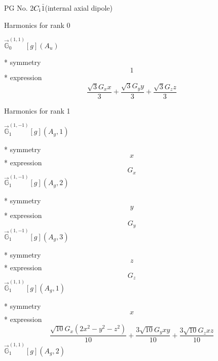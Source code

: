 \documentclass[fleqn,8pt]{jsarticle}
\begin{document}
\setcounter{MaxMatrixCols}{32}

\renewcommand{\tablename}{Table~}
\renewcommand{\figurename}{Figure~}
\begin{center}
\LARGE
PG No. 2\quad$C_{\rm i}$\quad$\bar{1}$\quad[ triclinic ] (internal axial dipole)
\end{center}

\noindent * Harmonics for rank 0

\noindent\quad $\vec{\mathbb{G}}_{0}^{(1,1)}[g](A_{u})$

\noindent\quad ** symmetry
\begin{dmath*}
1
\end{dmath*}
\noindent\quad ** expression
\begin{dmath*}
\frac{\sqrt{3} G_{x} x}{3} + \frac{\sqrt{3} G_{y} y}{3} + \frac{\sqrt{3} G_{z} z}{3}
\end{dmath*}

\noindent * Harmonics for rank 1

\noindent\quad $\vec{\mathbb{G}}_{1}^{(1,-1)}[g](A_{g},1)$

\noindent\quad ** symmetry
\begin{dmath*}
x
\end{dmath*}
\noindent\quad ** expression
\begin{dmath*}
G_{x}
\end{dmath*}
\noindent\quad $\vec{\mathbb{G}}_{1}^{(1,-1)}[g](A_{g},2)$

\noindent\quad ** symmetry
\begin{dmath*}
y
\end{dmath*}
\noindent\quad ** expression
\begin{dmath*}
G_{y}
\end{dmath*}
\noindent\quad $\vec{\mathbb{G}}_{1}^{(1,-1)}[g](A_{g},3)$

\noindent\quad ** symmetry
\begin{dmath*}
z
\end{dmath*}
\noindent\quad ** expression
\begin{dmath*}
G_{z}
\end{dmath*}
\noindent\quad $\vec{\mathbb{G}}_{1}^{(1,1)}[g](A_{g},1)$

\noindent\quad ** symmetry
\begin{dmath*}
x
\end{dmath*}
\noindent\quad ** expression
\begin{dmath*}
\frac{\sqrt{10} G_{x} \left(2 x^{2} - y^{2} - z^{2}\right)}{10} + \frac{3 \sqrt{10} G_{y} x y}{10} + \frac{3 \sqrt{10} G_{z} x z}{10}
\end{dmath*}
\noindent\quad $\vec{\mathbb{G}}_{1}^{(1,1)}[g](A_{g},2)$
\end{document}
